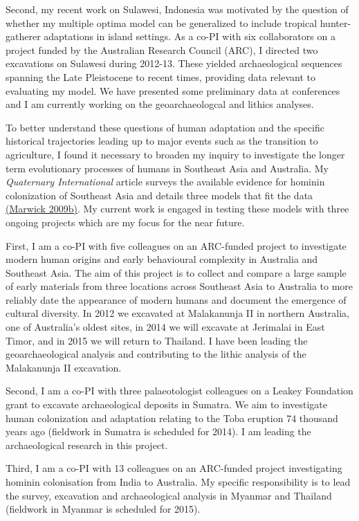 \documentclass[11pt,article,oneside]{memoir}
\begin{document}
Second, my recent work on Sulawesi, Indonesia was motivated by the question of whether my multiple optima model can be generalized to include tropical hunter-gatherer adaptations in island settings. As a co-PI with six collaborators on a project funded by the Australian Research Council (ARC), I directed two excavations on Sulawesi during 2012-13. These yielded archaeological sequences spanning the Late Pleistocene to recent times, providing data relevant to evaluating my model. We have presented some preliminary data at conferences and I am currently working on the geoarchaeologcal and lithics analyses.

To better understand these questions of human adaptation and the specific historical trajectories leading up to major events such as the transition to agriculture, I found it necessary to broaden my inquiry to investigate the longer term evolutionary processes of humans in Southeast Asia and Australia. My \textit{Quaternary International} article surveys the available evidence for hominin colonization of Southeast Asia and details three models that fit the data {\href{http://faculty.washington.edu/bmarwick/PDFs/Marwick_2009_QI.pdf}{(Marwick 2009b)}}. My current work is engaged in testing these models with three ongoing projects which are my focus for the near future. 

First, I am a co-PI with five colleagues on an ARC-funded project to investigate modern human origins and early behavioural complexity in Australia and Southeast Asia. The aim of this project is to collect and compare a large sample of early materials from three locations across Southeast Asia to Australia to more reliably date the appearance of modern humans and document the emergence of cultural diversity. In 2012 we excavated at Malakanunja II in northern Australia, one of Australia's oldest sites, in 2014 we will excavate at Jerimalai in East Timor, and in 2015 we will return to Thailand. I have been leading the geoarchaeological analysis and contributing to the lithic analysis of the Malakanunja II excavation. 

Second, I am a co-PI with three palaeotologist colleagues on a Leakey Foundation grant to excavate archaeological deposits in Sumatra. We aim to investigate human colonization and adaptation relating to the Toba eruption 74 thousand years ago (fieldwork in Sumatra is scheduled for 2014). I am leading the archaeological research in this project.

Third, I am a co-PI with 13 colleagues on an ARC-funded project investigating hominin colonisation from India to Australia. My specific responsibility is to lead the survey, excavation and archaeological analysis in Myanmar and Thailand (fieldwork in Myanmar is scheduled for 2015).
\end{document}
